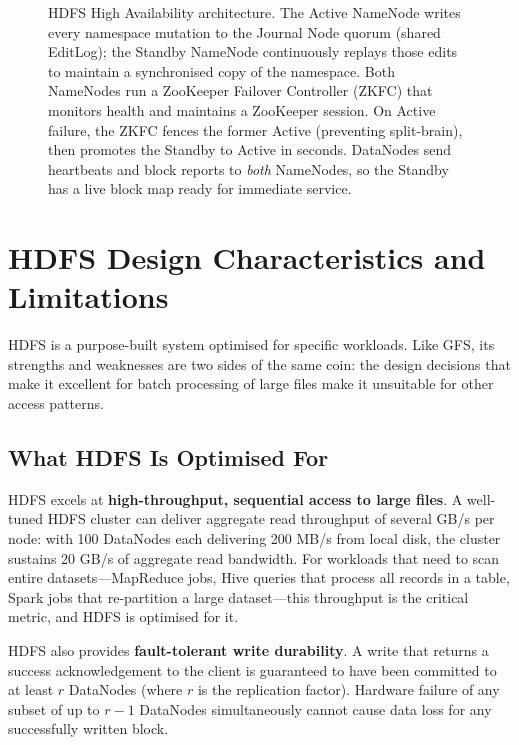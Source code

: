 \begin{figure}[h!t]
\begin{tikzpicture}
\end{tikzpicture}
\caption{HDFS High Availability architecture. The Active NameNode writes every
         namespace mutation to the Journal Node quorum (shared EditLog); the
         Standby NameNode continuously replays those edits to maintain a
         synchronised copy of the namespace. Both NameNodes run a
         ZooKeeper Failover Controller (ZKFC) that monitors health and
         maintains a ZooKeeper session. On Active failure, the ZKFC fences
         the former Active (preventing split-brain), then promotes the Standby
         to Active in seconds. DataNodes send heartbeats and block reports to
         \emph{both} NameNodes, so the Standby has a live block map
         ready for immediate service.}
\label{fig:hdfs-ha}
\end{figure}

\section{HDFS Design Characteristics and Limitations}
\label{sec:hdfs-limits}

HDFS is a purpose-built system optimised for specific workloads. Like
GFS, its strengths and weaknesses are two sides of the same coin: the
design decisions that make it excellent for batch processing of large
files make it unsuitable for other access patterns.

\subsection{What HDFS Is Optimised For}
\label{subsec:hdfs-strengths}

HDFS excels at \textbf{high-throughput, sequential access to large
files}. A well-tuned HDFS cluster can deliver aggregate read throughput
of several GB/s per node: with 100 DataNodes each delivering 200 MB/s
from local disk, the cluster sustains 20 GB/s of aggregate read
bandwidth. For workloads that need to scan entire datasets---MapReduce
jobs, Hive queries that process all records in a table, Spark jobs that
re-partition a large dataset---this throughput is the critical metric,
and HDFS is optimised for it.

HDFS also provides \textbf{fault-tolerant write durability}. A write
that returns a success acknowledgement to the client is guaranteed to
have been committed to at least $r$ DataNodes (where $r$ is the
replication factor). Hardware failure of any subset of up to $r-1$
DataNodes simultaneously cannot cause data loss for any successfully
written block.

